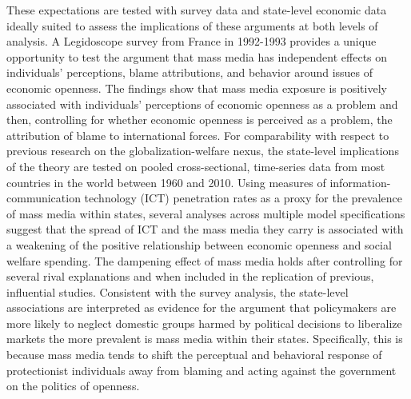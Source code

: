 \documentclass[12pt]{report}
\begin{document}
These expectations are tested with survey data and state-level economic data ideally suited to
assess the implications of these arguments at both levels of analysis. A Legidoscope survey from
France in 1992-1993 provides a unique opportunity to test the argument that mass media has
independent effects on individuals' perceptions, blame attributions, and behavior around issues of
economic openness. The findings show that mass media exposure is positively associated with
individuals' perceptions of economic openness as a problem and then, controlling for whether
economic openness is perceived as a problem, the attribution of blame to international forces. For
comparability with respect to previous research on the globalization-welfare nexus, the state-level
implications of the theory are tested on pooled cross-sectional, time-series data from most
countries in the world between 1960 and 2010. Using measures of information-communication technology
(ICT) penetration rates as a proxy for the prevalence of mass media within states, several analyses
across multiple model specifications suggest that the spread of ICT and the mass media they carry is
associated with a weakening of the positive relationship between economic openness and social
welfare spending. The dampening effect of mass media holds after controlling for several rival
explanations and when included in the replication of previous, influential studies. Consistent with
the survey analysis, the state-level associations are interpreted as evidence for the argument that
policymakers are more likely to neglect domestic groups harmed by political decisions to liberalize
markets the more prevalent is mass media within their states. Specifically, this is because mass
media tends to shift the perceptual and behavioral response of protectionist individuals away from
blaming and acting against the government on the politics of openness.
\end{document}
